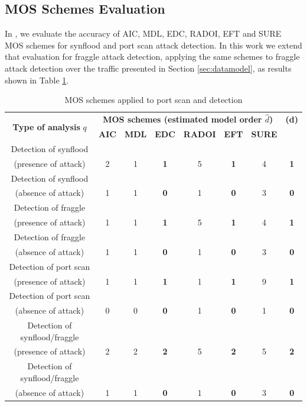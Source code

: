 \documentclass[review]{elsarticle}
\providecommand{\DIFaddtex}[1]{{\protect\color{blue}\uwave{#1}}} %
\providecommand{\DIFaddFL}[1]{\DIFadd{#1}} %
\providecommand{\DIFaddbeginFL}{} %
\providecommand{\DIFaddendFL}{} %
\providecommand{\DIFadd}[1]{\texorpdfstring{\DIFaddtex{#1}}{#1}} %
\begin{document}
\subsection{MOS Schemes Evaluation}
\label{sec:MOSSchemesEvaluation}

In \cite{tenorio2013greatest}, we evaluate the accuracy of AIC, MDL, EDC, RADOI, EFT and SURE MOS schemes \cite{da2009comparison,tenorio2013greatest} for synflood and port scan attack detection. In this work we extend that evaluation for fraggle attack detection, applying the same schemes to fraggle attack detection over the traffic presented in Section \ref{sec:datamodel}, as results shown in Table \ref{tab:tab4}.

\begin{table}[h!]
  \centering
  \scriptsize
  \caption{MOS schemes applied to port scan and \DIFaddbeginFL \DIFaddFL{flood }\DIFaddendFL detection}
  \label{tab:tab4}
  \begin{tabular}{ c c c c c c c c }
	\toprule
	\multirow{2}{*}{\textbf{Type of analysis} $q$} &\multicolumn{6}{c}{\textbf{MOS schemes (estimated model order $\hat{d}$)}} &{\textbf{(d)}}\\ 
			\hhline{~------~}
		&\textbf{AIC} &\textbf{MDL} &\textbf{EDC} &\textbf{RADOI} &\textbf{EFT} &\textbf{SURE}\\
	\midrule
	Detection of synflood \\(presence of attack) &2 &1 &\textbf{1} &5 &\textbf{1} &4 &\textbf{1} \\
	Detection of synflood \\(absence of attack) &1 &1 &\textbf{0} &1 &\textbf{0} &3 &\textbf{0} \\
	\midrule
	Detection of fraggle \\(presence of attack) &1 &1 &\textbf{1} &5 &\textbf{1} &4 &\textbf{1} \\
	Detection of fraggle \\(absence of attack) &1 &1 &\textbf{0} &1 &\textbf{0} &3 &\textbf{0} \\
	\midrule
	Detection of port scan \\(presence of attack) &1 &1 &\textbf{1} &1 &\textbf{1} &9 &\textbf{1} \\
	Detection of port scan \\(absence of attack) &0 &0 &\textbf{0} &1 &\textbf{0} &1 &\textbf{0} \\
	\midrule
	Detection of synflood/fraggle \\(presence of attack) &2 &2 &\textbf{2} &5 &\textbf{2} &5 &\textbf{2} \\
	Detection of synflood/fraggle \\(absence of attack) &1 &1 &\textbf{0} &1 &\textbf{0} &3 &\textbf{0} \\
    \bottomrule
  \end{tabular}
\end{table}
\end{document}
